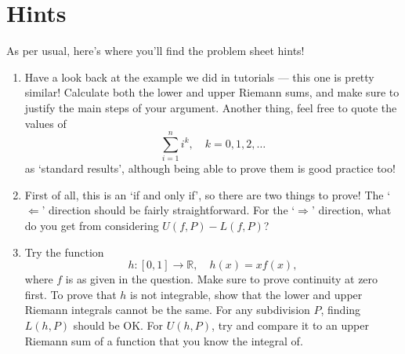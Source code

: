 \documentclass[
  12pt,
  a4paper]{extarticle}
\providecommand{\tightlist}{%
  \setlength{\itemsep}{0pt}\setlength{\parskip}{0pt}}
\theoremstyle{plain}
\theoremstyle{definition}
\theoremstyle{plain}
\theoremstyle{plain}
\theoremstyle{plain}
\theoremstyle{plain}
\theoremstyle{definition}
\theoremstyle{definition}
\theoremstyle{remark}
\theoremstyle{remark}
\renewcommand{\;}{\,}
\begin{document}
\hypertarget{hints}{%
\section{Hints}\label{hints}}

As per usual, here's where you'll find the problem sheet hints!

\begin{enumerate}
\def\labelenumi{\arabic{enumi})}
\tightlist
\item
  Have a look back at the example we did in tutorials --- this one is pretty similar! Calculate both the lower and upper Riemann sums, and make sure to justify the main steps of your argument. Another thing, feel free to quote the values of \[\sum_{i=1}^{n} i^{k}, \quad k=0,1,2,\ldots\] as `standard results', although being able to prove them is good practice too!
\item
  First of all, this is an `if and only if', so there are two things to prove! The `\(\Leftarrow\)' direction should be fairly straightforward. For the `\(\Rightarrow\)' direction, what do you get from considering \(U(f,P) - L(f,P)\)?
\item
  Try the function \[h:[0,1] \to \mathbb{R}, \quad h(x) = xf(x),\] where \(f\) is as given in the question. Make sure to prove continuity at zero first. To prove that \(h\) is not integrable, show that the lower and upper Riemann integrals cannot be the same. For any subdivision \(P\), finding \(L(h,P)\) should be OK. For \(U(h,P)\), try and compare it to an upper Riemann sum of a function that you know the integral of.
\end{enumerate}
\end{document}
